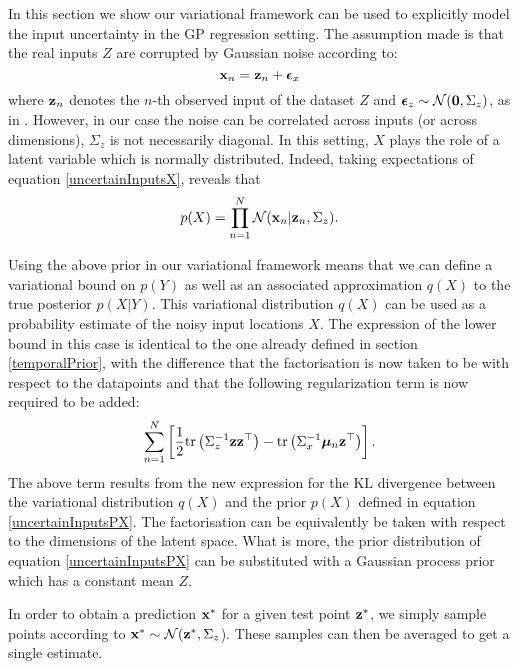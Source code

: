 In this section we show our variational framework can be used to explicitly model the input uncertainty
in the GP regression setting. 
The assumption made is that the real inputs $Z$ are corrupted by Gaussian noise according to:
\begin{equation}
\label{uncertainInputsX}
 \mathbf{x}_n = \mathbf{z}_n + \boldsymbol \epsilon_x
\end{equation}
where $\mathbf{z}_n$ denotes the $n$-th observed input of the dataset $Z$ and $\boldsymbol \epsilon_z \sim \mathcal{N}(\mathbf{0}, \Sigma_z)$,
as in \cite{mchutchon:gaussian}. However, in our case the noise can be correlated across inputs (or across dimensions),
\ie $\Sigma_z$ is not necessarily diagonal. In this setting, $X$ plays the role of a latent variable which is normally
distributed. Indeed, taking expectations of equation \eqref{uncertainInputsX}, reveals that
\begin{equation}
 \label{uncertainInputsPX}
p(X) = \prod_{n=1}^N \mathcal{N}(\mathbf{x}_n | \mathbf{z}_n, \Sigma_z).
\end{equation}

Using the above prior in our variational framework means that we can define a variational bound on $p(Y)$ as well
as an associated approximation $q(X)$ to the true posterior $p(X|Y)$. This variational distribution $q(X)$ can be used
as a probability estimate of the noisy input locations $X$.
The expression of the lower bound in this case is identical to the one already defined in
section \ref{temporalPrior}, with the difference that the factorisation is now taken to be with respect to the datapoints
and that the following regularization term is now required to be added:
\begin{equation}
\sum_{n=1}^N \left[ \frac{1}{2} \text{tr} \left(\Sigma_z^{-1} \mathbf{z} \mathbf{z}^{\top} \right) 
                   - \text{tr} \left(\Sigma_x^{-1} \boldsymbol \mu_n \mathbf{z}^{\top} \right) \right] .
\end{equation}
The above term results from the new expression for the $\text{KL}$ divergence between the variational distribution
$q(X)$ and the prior $p(X)$ defined in equation \eqref{uncertainInputsPX}.
The factorisation can be equivalently be taken with respect to the dimensions of the latent space.
What is more, the prior distribution of equation \eqref{uncertainInputsPX} can be substituted
with a Gaussian process prior which has a constant mean $Z$.

In order to obtain a prediction $\mathbf{x}^*$ for a given test point $\mathbf{z}^*$, we simply sample points
according to $\mathbf{x}^* \sim \mathcal{N}(\mathbf{z}^*, \Sigma_z$). These samples can then be averaged
to get a single estimate.

